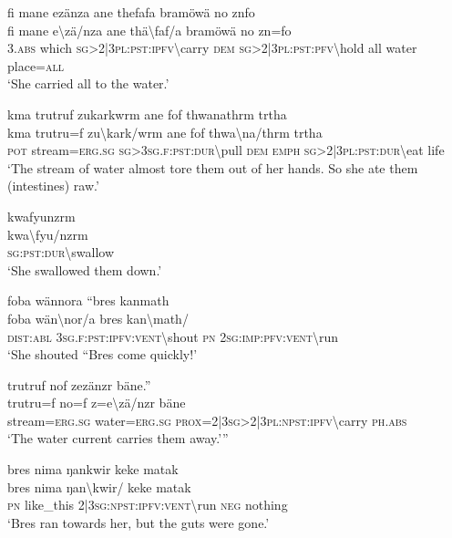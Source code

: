 \ea\label{ex:8:a1706}
fi mane ezänza ane thefafa bramöwä no znfo\\
\gll fi	mane	e{\textbackslash}zä/nza	ane	thä{\textbackslash}faf/a	bramöwä	no	zn=fo\\
     3.\textsc{abs}	which	\textsc{sg}>2|3\textsc{pl}:\textsc{pst}:\textsc{ipfv}{\textbackslash}carry	\textsc{dem}	\textsc{sg}>2|3\textsc{pl}:\textsc{pst}:\textsc{pfv}{\textbackslash}hold	all	water	place=\textsc{all}\\
\glt `She carried all to the water.'
\z

\ea\label{ex:8:a1708}
kma trutruf zukarkwrm ane fof thwanathrm trtha\\
\gll kma	trutru=f	zu{\textbackslash}kark/wrm	ane	fof	thwa{\textbackslash}na/thrm	trtha\\
     \textsc{pot}	stream=\textsc{erg}.\textsc{sg}	\textsc{sg}>3\textsc{sg}.\textsc{f}:\textsc{pst}:\textsc{dur}{\textbackslash}pull	\textsc{dem}	\textsc{emph}	\textsc{sg}>2|3\textsc{pl}:\textsc{pst}:\textsc{dur}{\textbackslash}eat	life\\
\glt `The stream of water almost tore them out of her hands. So she ate them (intestines) raw.'
\z

\ea\label{ex:8:a1709}
kwafyunzrm\\
\gll kwa{\textbackslash}fyu/nzrm\\
     \textsc{sg}:\textsc{pst}:\textsc{dur}{\textbackslash}swallow\\
\glt `She swallowed them down.'
\z

\ea\label{ex:8:a1710}
foba wännora ``bres kanmath\\
\gll foba	wän{\textbackslash}nor/a	bres	kan{\textbackslash}math/\\
     \textsc{dist}:\textsc{abl}	3\textsc{sg}.\textsc{f}:\textsc{pst}:\textsc{ipfv}:\textsc{vent}{\textbackslash}shout	\textsc{pn}	2\textsc{sg}:\textsc{imp}:\textsc{pfv}:\textsc{vent}{\textbackslash}run\\
\glt `She shouted ``Bres come quickly!'
\z

\ea\label{ex:8:a1712}
trutruf nof zezänzr bäne.''\\
\gll trutru=f	no=f	z=e{\textbackslash}zä/nzr	bäne\\
     stream=\textsc{erg}.\textsc{sg}	water=\textsc{erg}.\textsc{sg}	\textsc{prox}=2|3\textsc{sg}>2|3\textsc{pl}:\textsc{npst}:\textsc{ipfv}{\textbackslash}carry	\textsc{ph}.\textsc{abs}\\
\glt `The water current carries them away.'''
\z

\ea\label{ex:8:a1713}
bres nima ŋankwir keke matak\\
\gll bres	nima	ŋan{\textbackslash}kwir/	keke	matak\\
     \textsc{pn}	like\_this	2|3\textsc{sg}:\textsc{npst}:\textsc{ipfv}:\textsc{vent}{\textbackslash}run	\textsc{neg}	nothing\\
\glt `Bres ran towards her, but the guts were gone.'
\z

